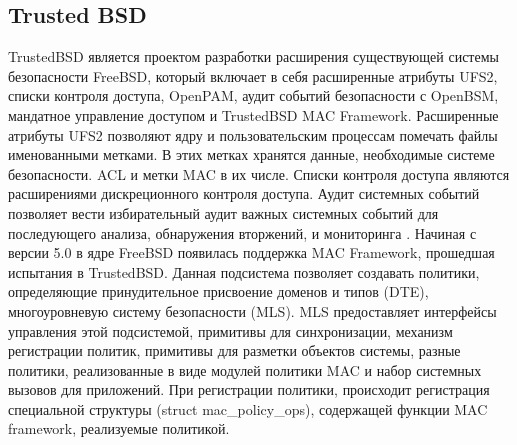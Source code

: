 \bigskip
\subsection{Trusted BSD} 

TrustedBSD является проектом разработки 
расширения существующей системы 
безопасности FreeBSD, который включает 
в себя  расширенные атрибуты UFS2, 
списки контроля доступа, OpenPAM, аудит событий 
безопасности с OpenBSM, мандатное управление доступом 
и TrustedBSD MAC Framework. 
Расширенные атрибуты UFS2 позволяют ядру и 
пользовательским процессам помечать файлы 
именованными метками. В этих метках
хранятся данные, необходимые системе безопасности. 
ACL и метки MAC в их числе. Списки контроля доступа являются 
 расширениями дискреционного контроля доступа. Аудит 
системных событий позволяет вести избирательный 
аудит важных системных событий для последующего 
анализа, обнаружения вторжений, и мониторинга  
. Начиная с версии 5.0 в ядре FreeBSD 
появилась поддержка MAC Framework, прошедшая испытания 
в TrustedBSD. Данная подсистема позволяет создавать политики, 
определяющие принудительное присвоение доменов и типов (DTE), 
многоуровневую систему безопасности (MLS). MLS  
предоставляет интерфейсы управления этой подсистемой, примитивы 
для синхронизации, механизм регистрации политик, примитивы 
для разметки объектов системы, разные политики, 
реализованные в виде модулей политики MAC и набор 
системных вызовов для приложений. При регистрации 
политики, происходит регистрация специальной структуры 
(struct mac\_policy\_ops), содержащей функции MAC 
framework, реализуемые политикой. 

\begin{comment}
На данный момент 
существуют следующие политики: 

mac\_biba – Реализация политики Biba, во многом 
схожей с MLS. Позволяет присваивать объектам и 
субъектам системы атрибуты доступа, которые образую 
иерархию уровней. Все операции над информацией в 
системе контролируются исходя из уровней 
взаимодействующих сущностей. 

mac\_ifoff позволяет администраторам контролировать 
сетевой трафик. 

mac\_lomac (Low-watermark MAC) еще одна 
реализация многоуровневого контроля доступа. 

mac\_bsdextended (file system firewall) Система 
защиты файлов, основанная на определении прав 
доступа на основании роли пользователя. 

mac\_mls реализация политики MLS. Объекты 
классифицируются некоторым образом, субъектам 
присваивают уровень доступа. 
\end{comment} 

